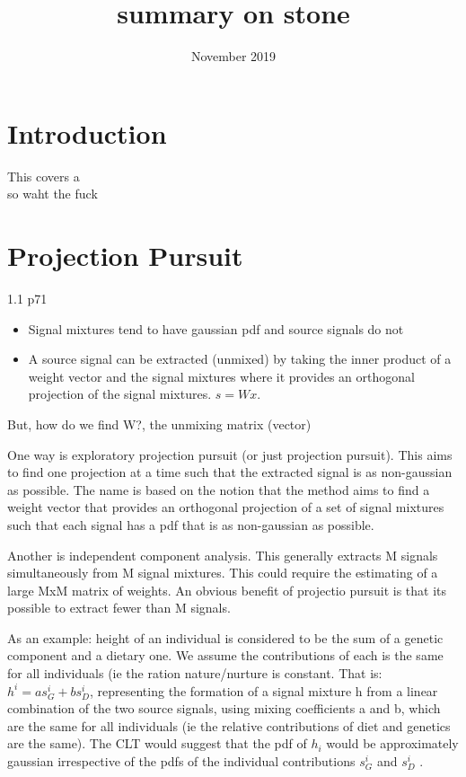 \documentclass{article}
\title{summary on stone}
\date{November 2019}
\begin{document}
\maketitle

\section{Introduction}

This covers a \\

so waht the fuck

\section{Projection Pursuit}

1.1 p71

\begin{itemize}
    \item  Signal mixtures tend to have gaussian pdf and source signals do not
    \item A source signal can be extracted (unmixed) by taking the inner product of a weight vector and the signal mixtures where it provides an orthogonal projection of the signal mixtures. $s=Wx$.
\end{itemize}

But, how do we find W?, the unmixing matrix (vector)

One way is exploratory projection pursuit (or just projection pursuit). This aims to find one projection at a time such that the extracted signal is as non-gaussian as possible. The name is based on the notion that the method aims to find a weight vector that provides an orthogonal projection of a set of signal mixtures such that each signal has a pdf that is as non-gaussian as possible.

Another is independent component analysis. This generally extracts M signals simultaneously from M signal mixtures. This could require the estimating of a large MxM matrix of weights. An obvious benefit of projectio pursuit is that its possible to extract fewer than M signals.

As an example: height of an individual is considered to be the sum of a genetic component and a dietary one. We assume the contributions of each is the same for all individuals (ie the ration nature/nurture is constant. That is: $h^{i}=as_{G}^{i}+bs_{D}^{i}$, representing the formation of a signal mixture h from a linear combination of the two source signals, using mixing coefficients a and b, which are the same for all individuals (ie the relative contributions of diet and genetics are the same). The CLT would suggest that the pdf of $h_{i}$ would be approximately gaussian irrespective of the pdfs of the individual contributions $s_{G}^{i}$ and $s_{D}^{i}$ .
\end{document}
